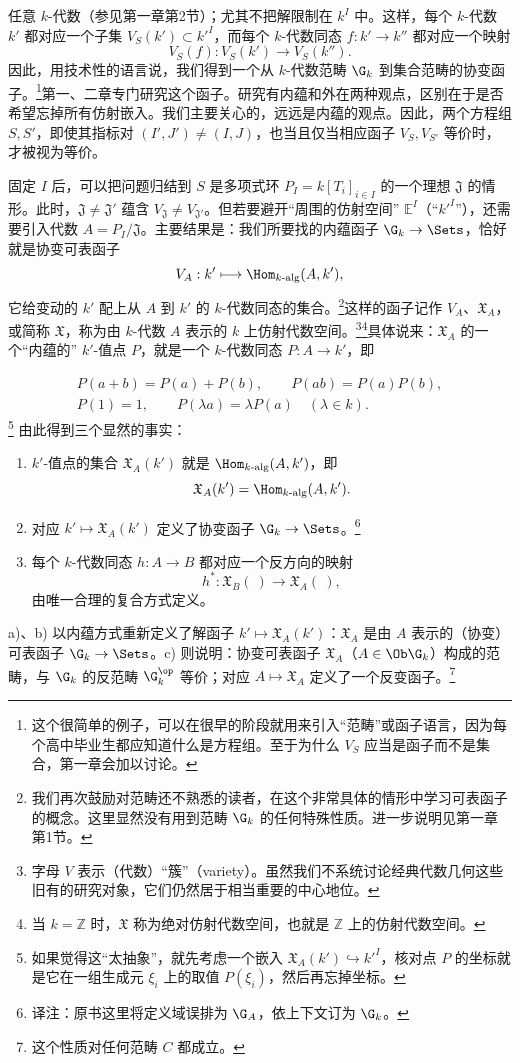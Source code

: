 任意 $k$-代数（参见第一章第2节）；尤其不把解限制在 $k^I$ 中。这样，每个 $k$-代数 $k'$ 都对应一个子集 $V_S(k')\subset k'^I$，而每个 $k$-代数同态 $f:k'\to k''$ 都对应一个映射
\[
V_S(f):V_S(k')\longrightarrow V_S(k'').
\]
因此，用技术性的语言说，我们得到一个从 $k$-代数范畴 $\G_k$ 到集合范畴的协变函子。\footnote{这个很简单的例子，可以在很早的阶段就用来引入“范畴”或函子语言，因为每个高中毕业生都应知道什么是方程组。至于为什么 $V_S$ 应当是函子而不是集合，第一章会加以讨论。}第一、二章专门研究这个函子。研究有内蕴和外在两种观点，区别在于是否希望忘掉所有仿射嵌入。我们主要关心的，远远是内蕴的观点。因此，两个方程组 $S,S'$，即使其指标对 $(I',J')\ne(I,J)$，也当且仅当相应函子 $V_S,V_{S'}$ 等价时，才被视为等价。

固定 $I$ 后，可以把问题归结到 $S$ 是多项式环 $P_I=k[T_i]_{i\in I}$ 的一个理想 $\mathfrak J$ 的情形。此时，$\mathfrak J\ne\mathfrak J'$ 蕴含 $V_{\mathfrak J}\ne V_{\mathfrak J'}$。但若要避开“周围的仿射空间” $\mathbb E^I$（“$k'^I$”），还需要引入代数 $A=P_I/\mathfrak J$。主要结果是：我们所要找的内蕴函子 $\G_k\to\Sets$，恰好就是协变可表函子
\[
V_A:k'\longmapsto\Hom_{k\text{-alg}}(A,k'),
\]
它给变动的 $k'$ 配上从 $A$ 到 $k'$ 的 $k$-代数同态的集合。\footnote{我们再次鼓励对范畴还不熟悉的读者，在这个非常具体的情形中学习可表函子的概念。这里显然没有用到范畴 $\G_k$ 的任何特殊性质。进一步说明见第一章第1节。}这样的函子记作 $V_A$、$\mathfrak X_A$，或简称 $\mathfrak X$，称为由 $k$-代数 $A$ 表示的 $k$ 上仿射代数空间。\footnote{字母 $V$ 表示（代数）“簇”（variety）。虽然我们不系统讨论经典代数几何这些旧有的研究对象，它们仍然居于相当重要的中心地位。}\footnote{当 $k=\mathbb Z$ 时，$\mathfrak X$ 称为绝对仿射代数空间，也就是 $\mathbb Z$ 上的仿射代数空间。}具体说来：$\mathfrak X_A$ 的一个“内蕴的” $k'$-值点 $P$，就是一个 $k$-代数同态 $P:A\to k'$，即

\[
\begin{gathered}
P(a+b)=P(a)+P(b),\qquad P(ab)=P(a)P(b),\\
P(1)=1,\qquad P(\lambda a)=\lambda P(a)\quad(\lambda\in k).
\end{gathered}
\]
\footnote{如果觉得这“太抽象”，就先考虑一个嵌入 $\mathfrak X_A(k')\hookrightarrow k'^I$，核对点 $P$ 的坐标就是它在一组生成元 $\xi_i$ 上的取值 $P(\xi_i)$，然后再忘掉坐标。}
由此得到三个显然的事实：
\begin{enumerate}[label=\alph*)]
\item $k'$-值点的集合 $\mathfrak X_A(k')$ 就是 $\Hom_{k\text{-alg}}(A,k')$，即
\[
\mathfrak X_A(k')=\Hom_{k\text{-alg}}(A,k').
\]
\item 对应 $k'\mapsto\mathfrak X_A(k')$ 定义了协变函子 $\G_k\to\Sets$。\footnote{译注：原书这里将定义域误排为 $\G_A$，依上下文订为 $\G_k$。}
\item 每个 $k$-代数同态 $h:A\to B$ 都对应一个反方向的映射
\[
h^*:\mathfrak X_B(\ )\longrightarrow\mathfrak X_A(\ ),
\]
由唯一合理的复合方式定义。
\end{enumerate}
a)、b) 以内蕴方式重新定义了解函子 $k'\mapsto\mathfrak X_A(k')$：$\mathfrak X_A$ 是由 $A$ 表示的（协变）可表函子 $\G_k\to\Sets$。c) 则说明：协变可表函子 $\mathfrak X_A$（$A\in\Ob\G_k$）构成的范畴，与 $\G_k$ 的反范畴 $\G_k^{\op}$ 等价；对应 $A\mapsto\mathfrak X_A$ 定义了一个反变函子。\footnote{这个性质对任何范畴 $C$ 都成立。}

